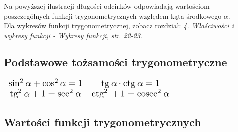 \documentclass[14pt,a4paper]{extarticle}
\newcommand{\scalemath}[2][4]{\scalebox{#1}{\ensuremath{#2}}}
\begin{document}
\noindent Na powyższej ilustracji długości odcinków odpowiadają wartościom poszczególnych
funkcji trygonometrycznych względem kąta środkowego $\alpha$.\\

\noindent Dla wykresów funkcji trygonometrycznej, zobacz rozdział: \textit{4. Właściwości i wykresy funkcji - Wykresy funkcji, str. 22-23}.
\subsection{Podstawowe tożsamości trygonometryczne}

\begin{center}
{%
\renewcommand{\arraystretch}{2}
\renewcommand{\arraycolsep}{0.5cm}

\(
   \scalemath[1.3]{%
   \begin{array}{cc}
      \sin^{2} \alpha + \cos^{2} \alpha = 1 & \text{tg}\: \alpha \cdot \text{ctg}\: \alpha = 1\\
      \text{tg}^{2}\: \alpha + 1 = \text{sec}^{2}\: \alpha & \text{ctg}^{2}\: + 1 = \text{cosec}^{2}\: \alpha   
   \end{array}
   }%
\)

}%
\end{center}

\newpage

\subsection{Wartości funkcji trygonometrycznych}
\end{document}
